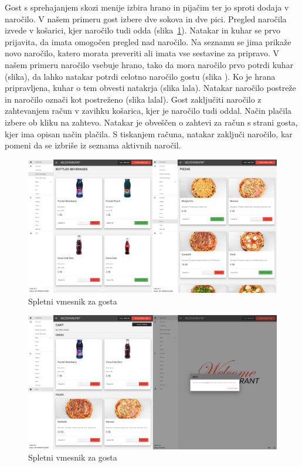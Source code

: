 \documentclass[a4paper, 12pt]{book}
\begin{document}
Gost s sprehajanjem skozi menije izbira hrano in pijačim ter jo sproti dodaja v naročilo. V našem primeru gost izbere dve sokova in dve pici. Pregled naročila izvede v košarici, kjer naročilo tudi odda (slika~\ref{Opis1}).
Natakar in kuhar se prvo prijavita, da imata omogočen pregled nad naročilo. Na seznamu se jima prikaže novo naročilo, katero morata preveriti ali imata vse sestavine za pripravo. V našem primeru naročilo vsebuje hrano, tako da mora naročilo prvo potrdi kuhar (slika), da lahko natakar potrdi celotno naročilo gostu (slika ). Ko je hrana pripravljena, kuhar o tem obvesti natakrja (slika lala). Natakar naročilo postreže in naročilo označi kot postreženo (slika lalal). Gost zaključiti naročilo z zahtevanjem račun v zavihku košarica, kjer je naročilo tudi oddal. Način plačila izbere ob kliku na zahtevo. Natakar je obveščen o zahtevi za račun s strani gosta, kjer ima opisan način plačila. S tiskanjem računa, natakar zaključi naročilo, kar pomeni da se izbriše iz seznama aktivnih naročil.

\begin{figure}[!htb]
\begin{center}
\includegraphics[width=14cm]{opis1.jpg}
\caption{Spletni vmesnik za gosta}
\label{Opis1}
\end{center}
\end{figure}

\begin{figure}[!htb]
\begin{center}
\includegraphics[width=14cm]{opis11.jpg}
\caption{Spletni vmesnik za gosta}
\label{Opis2}
\end{center}
\end{figure}
\end{document}
